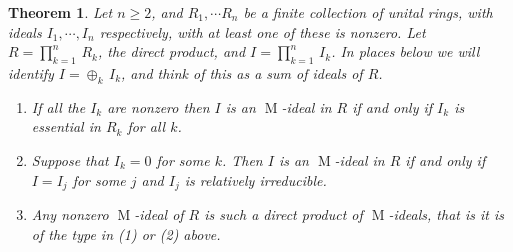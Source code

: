 \documentclass[11pt,leqno]{amsart}
\DeclareMathOperator{\m}{M}
\newtheorem{theorem}{Theorem}[section]
\theoremstyle{definition}
\theoremstyle{remark}
\numberwithin{equation}{section}
\numberwithin{equation}{section}
\begin{document}
\begin{theorem} \label{fix} Let $n \geq 2$, and $R_1,  \cdots R_n$ be a finite collection of unital rings, with ideals $I_1, \cdots , I_n$ respectively, with
at least one of these is nonzero.
Let  $R =  \prod_{k=1}^n \, R_k$, the direct product, and  $I = \prod_{k=1}^n \, I_k$.
In places below we will  identify $I = \oplus_k \, I_k$, and think of this as a sum of ideals of $R$. 
\begin{enumerate}
\item If all the $I_k$ are nonzero then $I$ is  an $\m$-ideal in $R$ if and only if $I_k$ is essential in $R_k$ for all $k$.
\item Suppose that  $I_k = 0$ for some $k$.  Then   $I$ is an $\m$-ideal in $R$ if and only if $I = I_j$ for some $j$
and  $I_j$ is relatively irreducible.

\item Any  nonzero
$\m$-ideal of $R$ is such a direct product of $\m$-ideals, that is it is of the type in {\rm (1)} or {\rm 
 (2)} above. 
\end{enumerate} \end{theorem}
	
\end{document}
